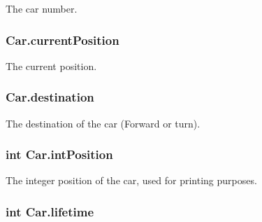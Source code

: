 The car number. 

\hypertarget{class_car_aa2011891bfead81fe201257172843a95}{
\subsubsection[{current\+Position}]{ Car.\+current\+Position\hspace{0.3cm}{\ttfamily [protected]}}}\label{class_car_aa2011891bfead81fe201257172843a95}


The current position. 

\hypertarget{class_car_a8ec85c8488be9a19f14077fb861b7753}{
\subsubsection[{destination}]{ Car.\+destination\hspace{0.3cm}{\ttfamily [protected]}}}\label{class_car_a8ec85c8488be9a19f14077fb861b7753}


The destination of the car (Forward or turn). 

\hypertarget{class_car_a37c19f61aed67e2b9ec340f5ef4f99bd}{
\subsubsection[{int\+Position}]{\setlength{\rightskip}{0pt plus 5cm}int Car.\+int\+Position\hspace{0.3cm}{\ttfamily [protected]}}}\label{class_car_a37c19f61aed67e2b9ec340f5ef4f99bd}


The integer position of the car, used for printing purposes. 

\hypertarget{class_car_a6c77e5ff6ce04822eca2d7b246d3b516}{
\subsubsection[{lifetime}]{\setlength{\rightskip}{0pt plus 5cm}int Car.\+lifetime\hspace{0.3cm}{\ttfamily [protected]}}}\label{class_car_a6c77e5ff6ce04822eca2d7b246d3b516}


